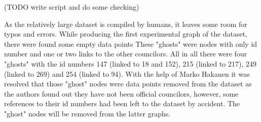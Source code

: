 \documentclass[a4paper,12pt]{article}
\begin{document}
\begin{onehalfspace}
(TODO write script and do some checking)

As the relatively large dataset is compiled by humans, it leaves some room for typos and errors. While producing the first experimental graph of the dataset, there were found some empty data points These "ghosts" were nodes with only id number and one or two links to the other councilors. All in all there were four "ghosts" with the id numbers 147 (linked to 18 and 152), 215 (linked to 217), 249 (linked to 269) and 254 (linked to 94). With the help of Marko Hakanen it was resolved that those "ghost" nodes were data points removed from the dataset as the authors found out they have not been official councilors, however, some references to their id numbers had been left to the dataset by accident. The "ghost" nodes will be removed from the latter graphs.

\printbibliography
\end{onehalfspace}
\end{document}
